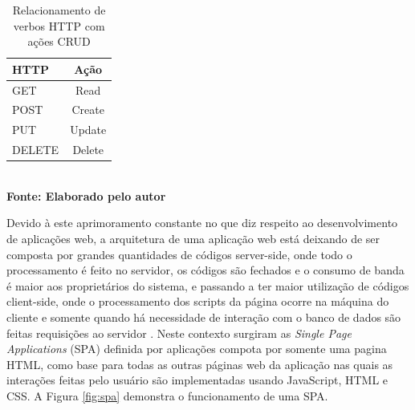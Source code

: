 \begin{table}[htb]
	\centering
	\caption{\hspace{0.1cm} Relacionamento de verbos HTTP com ações CRUD}
	\vspace{-0.3cm} %
	\label{tab:tabela1}
	\begin{tabular}{l|c}
  \hline
    \textbf{HTTP} & \textbf{Ação} \\
    \hline
      GET & Read \\
      POST & Create \\
      PUT & Update \\
      DELETE & Delete \\
     \hline
 \end{tabular}
 	\vspace{.1cm}  %
	\small
	{\footnotesize\\ \textbf{Fonte: Elaborado pelo autor}}
\end{table}

Devido à este aprimoramento constante no que diz respeito ao desenvolvimento de aplicações web, a arquitetura de uma aplicação web está deixando 
de ser composta por grandes quantidades de códigos server-side, onde todo o processamento é feito no servidor, os códigos são fechados e o consumo 
de banda é maior aos proprietários do sistema, e passando a ter maior utilização de códigos client-side, onde o processamento dos scripts da página
ocorre na máquina do cliente e somente quando há necessidade de interação com o banco de dados são feitas requisições ao servidor \cite{spa01}. Neste 
contexto surgiram as \textit{Single Page Applications} (SPA) definida por \cite{spa02} aplicações compota por somente uma pagina HTML, como base para 
todas as outras páginas web da aplicação nas quais as interações feitas pelo usuário são implementadas usando JavaScript, HTML e CSS. A Figura 
\ref{fig:spa} demonstra o funcionamento de uma SPA.


